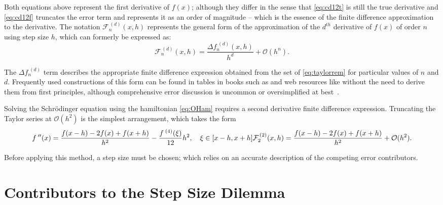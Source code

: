 Both equations above represent the first derivative of $f(x)$; although they differ in the sense that \cref{eq:cd12t} is still the true derivative and \cref{eq:cd12f} truncates the error term and represents it as an order of magnitude -- which is the essence of the finite difference approximation to the derivative.
The notation $\mathcal{F}_n^{\,(d)}(x,h)$ represents the general form of the approximation of the $d^{th}$ derivative of $f(x)$ of order $n$ using step size $h$, which can formerly be expressed as:
\begin{equation}
\mathcal{F}_n^{\,(d)}(x,h) = \frac{\Delta f_n^{\;(d)}(x,h)}{h^d} + \mathcal{O}(h^n).\label{eq:cdgeneral}
\end{equation}

The $\Delta f_n^{\;(d)}$ term describes the appropriate finite difference expression obtained from the set of \cref{eq:taylorrem} for particular values of $n$ and $d$.
Frequently used constructions of this form can be found in tables in books such as \citeauthor{Mathews2004} and web resources like \citeauthor{Holoborodko2009} without the need to derive them from first principles, although comprehensive error discussion is uncommon or oversimplified at best~\cite{Mathews2004,Holoborodko2009}.

Solving the Schr\"{o}dinger equation using the hamiltonian \cref{eq:OHam} requires a second derivative finite difference expression.
Truncating the Taylor series at $\mathcal{O}(h^2)$ is the simplest arrangement, which takes the form
\begin{equation}
f^{\;\prime\prime}(x) = \frac{f(x-h)-2f(x)+f(x+h)}{h^2} - \frac{f^{\;(4)}(\xi)}{12}h^2, \quad \xi \in [x-h,x+h]\label{eq:cd22t} \\
\mathcal{F}_2^{\,(2)}(x,h) = \frac{f(x-h)-2f(x)+f(x+h)}{h^2} + \mathcal{O}(h^2).\label{eq:cd22f}
\end{equation}

Before applying this method, a step size must be chosen; which relies on an accurate description of the competing error contributors.

\section{Contributors to the Step Size Dilemma}

